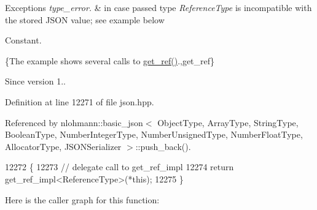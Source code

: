 \begin{DoxyExceptions}{Exceptions}
{\em type\+\_\+error.} & in case passed type {\itshape Reference\+Type} is incompatible with the stored J\+S\+ON value; see example below\\
\hline
\end{DoxyExceptions}
Constant.

\{The example shows several calls to {\ttfamily \hyperlink{classnlohmann_1_1basic__json_afbd800010b67619463c0fce6e74f7878}{get\+\_\+ref()}}.,get\+\_\+ref\}

\begin{DoxySince}{Since}
version 1.. 
\end{DoxySince}


Definition at line 12271 of file json.\+hpp.



Referenced by nlohmann\+::basic\+\_\+json$<$ Object\+Type, Array\+Type, String\+Type, Boolean\+Type, Number\+Integer\+Type, Number\+Unsigned\+Type, Number\+Float\+Type, Allocator\+Type, J\+S\+O\+N\+Serializer $>$\+::push\+\_\+back().


\begin{DoxyCode}
12272     \{
12273         \textcolor{comment}{// delegate call to get\_ref\_impl}
12274         \textcolor{keywordflow}{return} get\_ref\_impl<ReferenceType>(*this);
12275     \}
\end{DoxyCode}
Here is the caller graph for this function\+:
\mbox{\label{classnlohmann_1_1basic__json_ac382f3d2bc6a5d52d936e4e40593f03b}} 
